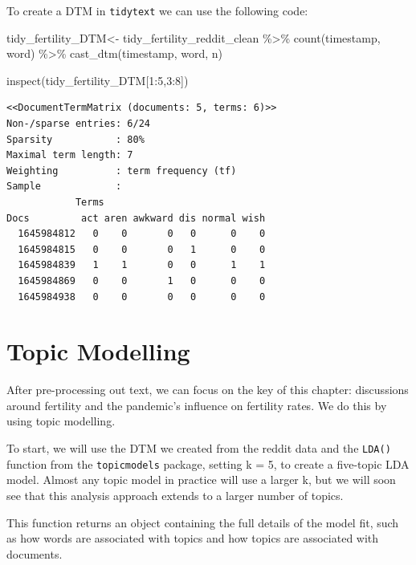 \documentclass[
  letterpaper,
  DIV=11,
  numbers=noendperiod]{scrreprt}
\newenvironment{Shaded}{\begin{snugshade}}{\end{snugshade}}
\newcommand{\DecValTok}[1]{\textcolor[rgb]{0.68,0.00,0.00}{#1}}
\newcommand{\FunctionTok}[1]{\textcolor[rgb]{0.28,0.35,0.67}{#1}}
\newcommand{\NormalTok}[1]{\textcolor[rgb]{0.00,0.23,0.31}{#1}}
\newcommand{\OtherTok}[1]{\textcolor[rgb]{0.00,0.23,0.31}{#1}}
\newcommand{\SpecialCharTok}[1]{\textcolor[rgb]{0.37,0.37,0.37}{#1}}
\begin{document}
To create a DTM in \texttt{tidytext} we can use the following code:

\begin{Shaded}
\begin{Highlighting}[]
\NormalTok{tidy\_fertility\_DTM}\OtherTok{\textless{}{-}}
\NormalTok{  tidy\_fertility\_reddit\_clean }\SpecialCharTok{\%\textgreater{}\%}
  \FunctionTok{count}\NormalTok{(timestamp, word) }\SpecialCharTok{\%\textgreater{}\%}
  \FunctionTok{cast\_dtm}\NormalTok{(timestamp, word, n)}

\FunctionTok{inspect}\NormalTok{(tidy\_fertility\_DTM[}\DecValTok{1}\SpecialCharTok{:}\DecValTok{5}\NormalTok{,}\DecValTok{3}\SpecialCharTok{:}\DecValTok{8}\NormalTok{])}
\end{Highlighting}
\end{Shaded}

\begin{verbatim}
<<DocumentTermMatrix (documents: 5, terms: 6)>>
Non-/sparse entries: 6/24
Sparsity           : 80%
Maximal term length: 7
Weighting          : term frequency (tf)
Sample             :
            Terms
Docs         act aren awkward dis normal wish
  1645984812   0    0       0   0      0    0
  1645984815   0    0       0   1      0    0
  1645984839   1    1       0   0      1    1
  1645984869   0    0       1   0      0    0
  1645984938   0    0       0   0      0    0
\end{verbatim}

\hypertarget{topic-modelling}{%
\section{Topic Modelling}\label{topic-modelling}}

After pre-processing out text, we can focus on the key of this chapter:
discussions around fertility and the pandemic's influence on fertility
rates. We do this by using topic modelling.

To start, we will use the DTM we created from the reddit data and the
\texttt{LDA()} function from the \texttt{topicmodels} package, setting k
= 5, to create a five-topic LDA model. Almost any topic model in
practice will use a larger k, but we will soon see that this analysis
approach extends to a larger number of topics.

This function returns an object containing the full details of the model
fit, such as how words are associated with topics and how topics are
associated with documents.
\end{document}
